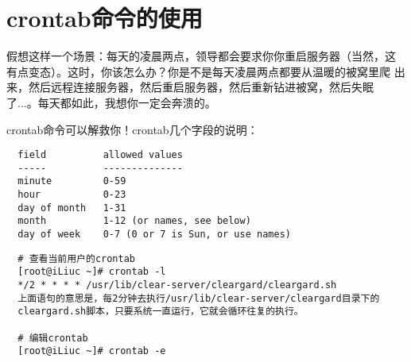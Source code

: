 \section{crontab命令的使用}
\label{sec:crontabCmd}

假想这样一个场景：每天的凌晨两点，领导都会要求你你重启服务器（当然，这
有点变态）。这时，你该怎么办？你是不是每天凌晨两点都要从温暖的被窝里爬
出来，然后远程连接服务器，然后重启服务器，然后重新钻进被窝，然后失眠
了...。每天都如此，我想你一定会奔溃的。

crontab命令可以解救你！crontab几个字段的说明：

\small{
\begin{verbatim}
  field          allowed values
  -----          --------------
  minute         0-59
  hour           0-23
  day of month   1-31
  month          1-12 (or names, see below)
  day of week    0-7 (0 or 7 is Sun, or use names)
\end{verbatim}
}
\normalsize

\small{
\begin{verbatim}
  # 查看当前用户的crontab
  [root@iLiuc ~]# crontab -l
  */2 * * * * /usr/lib/clear-server/cleargard/cleargard.sh
  上面语句的意思是，每2分钟去执行/usr/lib/clear-server/cleargard目录下的
  cleargard.sh脚本，只要系统一直运行，它就会循环往复的执行。

  # 编辑crontab
  [root@iLiuc ~]# crontab -e
\end{verbatim}
}
\normalsize
